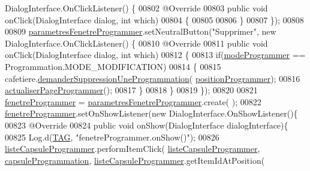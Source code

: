 \begin{DoxyCode}
      DialogInterface.OnClickListener() \{
00802             @Override
00803             \textcolor{keyword}{public} \textcolor{keywordtype}{void} onClick(DialogInterface dialog, \textcolor{keywordtype}{int} which)
00804             \{
00805 
00806             \}
00807         \});
00808 
00809         \hyperlink{classcom_1_1example_1_1ekawa_1_1_ihm_a6eb2afb2fe8da7f3a749089c84934145}{parametresFenetreProgrammer}.setNeutralButton(\textcolor{stringliteral}{"Supprimer"}, \textcolor{keyword}{new} 
      DialogInterface.OnClickListener() \{
00810             @Override
00811             \textcolor{keyword}{public} \textcolor{keywordtype}{void} onClick(DialogInterface dialog, \textcolor{keywordtype}{int} which)
00812             \{
00813                 \textcolor{keywordflow}{if}(\hyperlink{classcom_1_1example_1_1ekawa_1_1_ihm_acc8db4ba4fa39c343412d6ff57c2acbd}{modeProgrammer} == Programmation.MODE\_MODIFICATION)
00814                 \{
00815                     cafetiere.\hyperlink{classcom_1_1example_1_1ekawa_1_1_cafetiere_a0af9bf8f80c745c7919ea3efdc2183d0}{demanderSuppressionUneProgrammation}(
      \hyperlink{classcom_1_1example_1_1ekawa_1_1_ihm_ada29cde0c67d8614d47b27ed04c337e9}{positionProgrammer});
00816                     \hyperlink{classcom_1_1example_1_1ekawa_1_1_ihm_adbeeac61b5a53c52d21da490659de983}{actualiserPageProgrammer}();
00817                 \}
00818             \}
00819         \});
00820 
00821         \hyperlink{classcom_1_1example_1_1ekawa_1_1_ihm_addac9c5f93086d06e5131cd42f3be941}{fenetreProgrammer} = \hyperlink{classcom_1_1example_1_1ekawa_1_1_ihm_a6eb2afb2fe8da7f3a749089c84934145}{parametresFenetreProgrammer}.create(
      );
00822         \hyperlink{classcom_1_1example_1_1ekawa_1_1_ihm_addac9c5f93086d06e5131cd42f3be941}{fenetreProgrammer}.setOnShowListener(\textcolor{keyword}{new} DialogInterface.OnShowListener()\{
00823             @Override
00824             \textcolor{keyword}{public} \textcolor{keywordtype}{void} onShow(DialogInterface dialogInterface)\{
00825                 Log.d(\hyperlink{classcom_1_1example_1_1ekawa_1_1_ihm_a95cd92c2acaf9f8982302da08d94f9aa}{TAG}, \textcolor{stringliteral}{"fenetreProgrammer.onShow()"});
00826                 \hyperlink{classcom_1_1example_1_1ekawa_1_1_ihm_adfeb58df0ce9fa2088a7a708a54ffe07}{listeCapsuleProgrammer}.performItemClick(
      \hyperlink{classcom_1_1example_1_1ekawa_1_1_ihm_adfeb58df0ce9fa2088a7a708a54ffe07}{listeCapsuleProgrammer}, \hyperlink{classcom_1_1example_1_1ekawa_1_1_ihm_a2ddf5b95e2a3fbb3a15d160ba266295a}{capsuleProgrammation}, 
      \hyperlink{classcom_1_1example_1_1ekawa_1_1_ihm_adfeb58df0ce9fa2088a7a708a54ffe07}{listeCapsuleProgrammer}.getItemIdAtPosition(

\end{DoxyCode}
